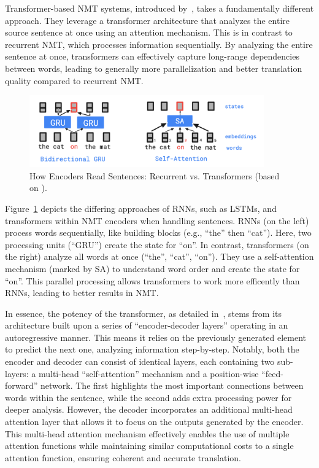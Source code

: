 {{Transformer-based NMT systems, introduced by~\textcite{Vaswani-2017}, takes a fundamentally different approach. They leverage a transformer architecture that analyzes the entire source sentence at once using an attention mechanism. This is in contrast to recurrent NMT, which processes information sequentially. By analyzing the entire sentence at once, transformers can effectively capture long-range dependencies between words, leading to generally more parallelization and better translation quality compared to recurrent NMT.

\begin{figure}[ht]
\centering
\includegraphics[width=0.9\textwidth]{textual/Figuras/self.png}
\caption{How Encoders Read Sentences: Recurrent vs. Transformers (based on \textcite{lakew2019multilingual}).}
\label{fig: rnn-transformers} 
\end{figure}

Figure~\ref{fig: rnn-transformers} depicts the differing approaches of RNNs, such as LSTMs, and transformers within NMT encoders when handling sentences. RNNs (on the left) process words sequentially, like building blocks (e.g., ``the'' then ``cat''). Here, two processing units (``GRU'') create the state for ``on''. In contrast, transformers (on the right) analyze all words at once (``the'', ``cat'', ``on''). They use a self-attention mechanism (marked by SA) to understand word order and create the state for ``on''. This parallel processing allows transformers to work more efficently than RNNs, leading to better results in NMT.

In essence, the potency of the transformer, as detailed in~\textcite{lakew2019multilingual}, stems from its architecture built upon a series of ``encoder-decoder layers'' operating in an autoregressive manner. This means it relies on the previously generated element to predict the next one, analyzing information step-by-step. Notably, both the encoder and decoder can consist of identical layers, each containing two sub-layers: a multi-head ``self-attention'' mechanism and a position-wise ``feed-forward'' network. The first highlights the most important connections between words within the sentence, while the second adds extra processing power for deeper analysis. However, the decoder incorporates an additional multi-head attention layer that allows it to focus on the outputs generated by the encoder. This multi-head attention mechanism effectively enables the use of multiple attention functions while maintaining similar computational costs to a single attention function, ensuring coherent and accurate translation.


}}
